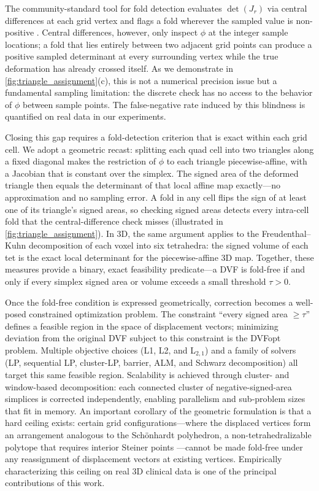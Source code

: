 \documentclass[lettersize,journal]{IEEEtran}
\begin{document}
The community-standard tool for fold detection evaluates $\det(J_r)$ via central differences at each grid vertex and flags a fold wherever the sampled value is non-positive \cite{learn2reg2023}. Central differences, however, only inspect $\phi$ at the integer sample locations; a fold that lies entirely between two adjacent grid points can produce a positive sampled determinant at every surrounding vertex while the true deformation has already crossed itself. As we demonstrate in \autoref{fig:triangle_assignment}(c), this is not a numerical precision issue but a fundamental sampling limitation: the discrete check has no access to the behavior of $\phi$ between sample points. The false-negative rate induced by this blindness is quantified on real data in our experiments.

Closing this gap requires a fold-detection criterion that is exact within each grid cell. We adopt a geometric recast: splitting each quad cell into two triangles along a fixed diagonal makes the restriction of $\phi$ to each triangle piecewise-affine, with a Jacobian that is constant over the simplex. The signed area of the deformed triangle then equals the determinant of that local affine map exactly---no approximation and no sampling error. A fold in any cell flips the sign of at least one of its triangle's signed areas, so checking signed areas detects every intra-cell fold that the central-difference check misses (illustrated in \autoref{fig:triangle_assignment}). In 3D, the same argument applies to the Freudenthal--Kuhn decomposition of each voxel into six tetrahedra: the signed volume of each tet is the exact local determinant for the piecewise-affine 3D map. Together, these measures provide a binary, exact feasibility predicate---a DVF is fold-free if and only if every simplex signed area or volume exceeds a small threshold $\tau > 0$.

Once the fold-free condition is expressed geometrically, correction becomes a well-posed constrained optimization problem. The constraint ``every signed area $\geq \tau$'' defines a feasible region in the space of displacement vectors; minimizing deviation from the original DVF subject to this constraint is the DVFopt problem. Multiple objective choices (L1, L2, and L$_{2,1}$) and a family of solvers (LP, sequential LP, cluster-LP, barrier, ALM, and Schwarz decomposition) all target this same feasible region. Scalability is achieved through cluster- and window-based decomposition: each connected cluster of negative-signed-area simplices is corrected independently, enabling parallelism and sub-problem sizes that fit in memory. An important corollary of the geometric formulation is that a hard ceiling exists: certain grid configurations---where the displaced vertices form an arrangement analogous to the Sch{\"o}nhardt polyhedron, a non-tetrahedralizable polytope that requires interior Steiner points \cite{schonhardt1928}---cannot be made fold-free under any reassignment of displacement vectors at existing vertices. Empirically characterizing this ceiling on real 3D clinical data is one of the principal contributions of this work.
\end{document}

